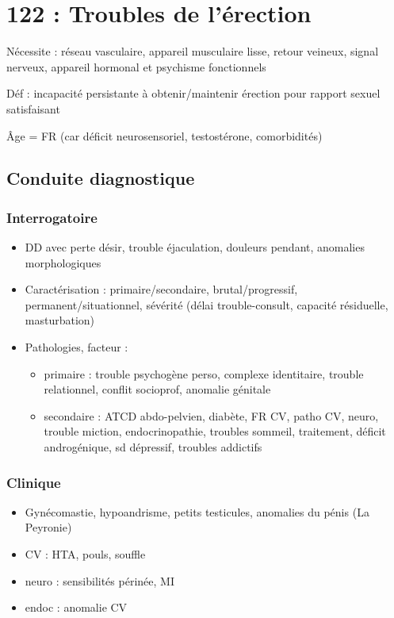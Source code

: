 \documentclass[11pt]{article}
\begin{document}
\section{122 : Troubles de l'érection}
\label{sec:orge604cb4}
Nécessite : réseau vasculaire, appareil musculaire lisse, retour veineux, signal  nerveux,
appareil hormonal et psychisme fonctionnels

Déf : incapacité persistante à obtenir/maintenir érection pour rapport sexuel satisfaisant

Âge = FR (car déficit neurosensoriel, \inc testostérone, comorbidités)

\subsection{Conduite  diagnostique}
\label{sec:org87a8d64}
\subsubsection{Interrogatoire}
\label{sec:orgfc16f44}
\begin{itemize}
\item DD avec perte désir, trouble éjaculation, douleurs pendant, anomalies morphologiques
\item Caractérisation : primaire/secondaire, brutal/progressif,
permanent/situationnel, sévérité (délai trouble-consult, capacité résiduelle,
masturbation)
\item Pathologies, facteur :
\begin{itemize}
\item primaire : trouble psychogène perso, complexe identitaire, trouble
relationnel, conflit socioprof, anomalie génitale
\item secondaire : ATCD abdo-pelvien, diabète, FR CV, patho CV, neuro, trouble
miction, endocrinopathie, troubles sommeil, traitement, déficit
androgénique, sd dépressif, troubles addictifs
\end{itemize}
\end{itemize}
\subsubsection{Clinique}
\label{sec:org48f6180}
\begin{itemize}
\item Gynécomastie, hypoandrisme, petits testicules, anomalies du pénis (La Peyronie)
\item CV : HTA, pouls, souffle
\item neuro : sensibilités périnée, MI
\item endoc : anomalie CV
\end{itemize}
\end{document}
